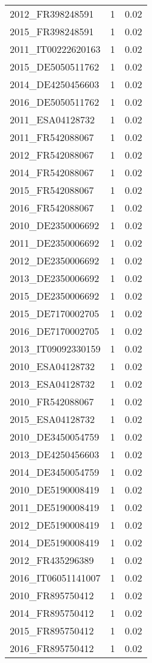 \begin{table*}[htbp]
\begin{tabular}{lrr}
2012_FR398248591 & 1 & 0.02 \\
2015_FR398248591 & 1 & 0.02 \\
2011_IT00222620163 & 1 & 0.02 \\
2015_DE5050511762 & 1 & 0.02 \\
2014_DE4250456603 & 1 & 0.02 \\
2016_DE5050511762 & 1 & 0.02 \\
2011_ESA04128732 & 1 & 0.02 \\
2011_FR542088067 & 1 & 0.02 \\
2012_FR542088067 & 1 & 0.02 \\
2014_FR542088067 & 1 & 0.02 \\
2015_FR542088067 & 1 & 0.02 \\
2016_FR542088067 & 1 & 0.02 \\
2010_DE2350006692 & 1 & 0.02 \\
2011_DE2350006692 & 1 & 0.02 \\
2012_DE2350006692 & 1 & 0.02 \\
2013_DE2350006692 & 1 & 0.02 \\
2015_DE2350006692 & 1 & 0.02 \\
2015_DE7170002705 & 1 & 0.02 \\
2016_DE7170002705 & 1 & 0.02 \\
2013_IT09092330159 & 1 & 0.02 \\
2010_ESA04128732 & 1 & 0.02 \\
2013_ESA04128732 & 1 & 0.02 \\
2010_FR542088067 & 1 & 0.02 \\
2015_ESA04128732 & 1 & 0.02 \\
2010_DE3450054759 & 1 & 0.02 \\
2013_DE4250456603 & 1 & 0.02 \\
2014_DE3450054759 & 1 & 0.02 \\
2010_DE5190008419 & 1 & 0.02 \\
2011_DE5190008419 & 1 & 0.02 \\
2012_DE5190008419 & 1 & 0.02 \\
2014_DE5190008419 & 1 & 0.02 \\
2012_FR435296389 & 1 & 0.02 \\
2016_IT06051141007 & 1 & 0.02 \\
2010_FR895750412 & 1 & 0.02 \\
2014_FR895750412 & 1 & 0.02 \\
2015_FR895750412 & 1 & 0.02 \\
2016_FR895750412 & 1 & 0.02 \\

\end{tabular}
\end{table*}
